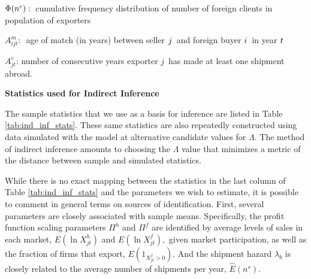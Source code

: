 \documentclass[12pt,titlepage]{article}
\begin{document}
\begin{table}[tbp]
{${\small \Phi }{\small (n^{c})}:${\small \ cumulative frequency distribution of number of foreign clients in population of exporters }

$A_{ijt}^{m}:${\small \ age of match (in years) between seller }${\small j}${\small \ and foreign buyer }${\small i}${\small \ in year }${\small t} ${\small \ }

$A_{jt}^{c}${\small : number of consecutive years exporter }$j${\small \ has
made at least one shipment abroad.}
}%
\caption{\textbf{Statistics used for Indirect Inference}}
\label{tab:ind_inf_stats}
\end{table}%

The sample statistics that we use as a basis for inference are listed in
Table \ref{tab:ind_inf_stats}. These same statistics are also repeatedly constructed using data
simulated with the model at alternative candidate values for $\Lambda $. The
method of indirect inference amounts to choosing the $\Lambda $ value that
minimizes a metric of the distance between sample and simulated 
statistics.\footnotemark{}


While there is no exact mapping between the statistics in the last column of
Table \ref{tab:ind_inf_stats} and the parameters we wish to estimate, it is possible to comment in
general terms on sources of identification. First, several parameters are
closely associated with sample means. Specifically, the profit function
scaling parameters $\Pi ^{h}$ and $\Pi ^{f}$ are identified by average
levels of sales in each market, $E(\ln X_{jt}^{h})$ and $E(\ln X_{jt}^{f}),$
given market participation, as well as the fraction of firms that export, $%
E(1_{X_{jt}^{f}>0})$. And the shipment hazard $\lambda _{b}$ is closely
related to the average number of shipments per year, $\widehat{E}\left(
n^{s}\right) .$
\end{document}
